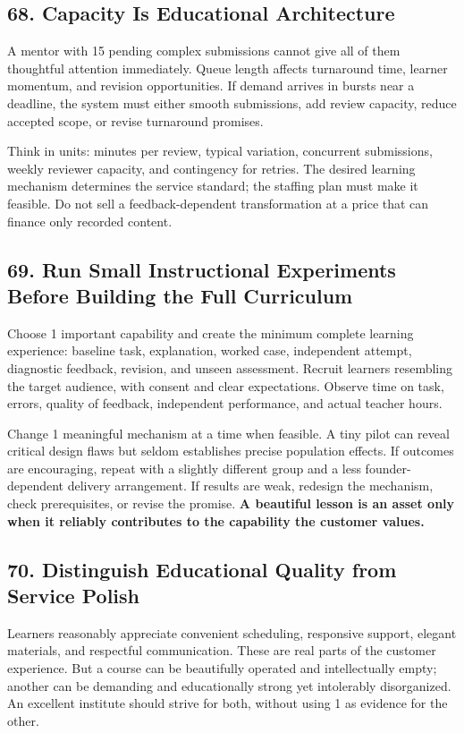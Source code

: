 \subsection*{68. Capacity Is Educational Architecture}

A mentor with 15 pending complex submissions cannot give all of them thoughtful attention immediately. Queue length affects turnaround time, learner momentum, and revision opportunities. If demand arrives in bursts near a deadline, the system must either smooth submissions, add review capacity, reduce accepted scope, or revise turnaround promises.

Think in units: minutes per review, typical variation, concurrent submissions, weekly reviewer capacity, and contingency for retries. The desired learning mechanism determines the service standard; the staffing plan must make it feasible. Do not sell a feedback-dependent transformation at a price that can finance only recorded content.

\subsection*{69. Run Small Instructional Experiments Before Building the Full Curriculum}

Choose 1 important capability and create the minimum complete learning experience: baseline task, explanation, worked case, independent attempt, diagnostic feedback, revision, and unseen assessment. Recruit learners resembling the target audience, with consent and clear expectations. Observe time on task, errors, quality of feedback, independent performance, and actual teacher hours.

Change 1 meaningful mechanism at a time when feasible. A tiny pilot can reveal critical design flaws but seldom establishes precise population effects. If outcomes are encouraging, repeat with a slightly different group and a less founder-dependent delivery arrangement. If results are weak, redesign the mechanism, check prerequisites, or revise the promise. \textbf{A beautiful lesson is an asset only when it reliably contributes to the capability the customer values.}

\subsection*{70. Distinguish Educational Quality from Service Polish}

Learners reasonably appreciate convenient scheduling, responsive support, elegant materials, and respectful communication. These are real parts of the customer experience. But a course can be beautifully operated and intellectually empty; another can be demanding and educationally strong yet intolerably disorganized. An excellent institute should strive for both, without using 1 as evidence for the other.

